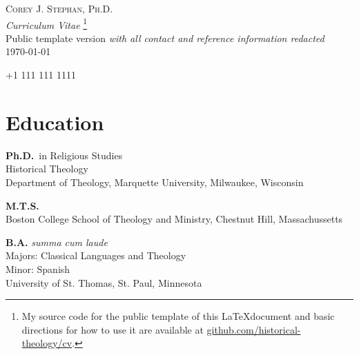 \documentclass[letterpaper,12pt]{article}
\newcommand{\years}[1]{%
  {\reversemarginpar\strut\marginnote{{\small#1}}}%
}
\begin{document}
{
\begin{center}
  \Huge \textsc{Corey J. Stephan, Ph.D.} \\
  
  \normalsize \emph{Curriculum Vitae}
  \footnote{My source code for the public template of this \LaTeX\space document and basic directions for how to use it are available at \href{https:www.github.com/historical-theology/cv}{github.com/historical-theology/cv}.} \\
	Public template version \emph{with all contact and reference information redacted}\\ 
   														
  \today
\end{center}
  \begin{center}
    \normalsize
      \faPhone\space+1 111 111 1111 \space 															
      \enspace\faEnvelope{} \space
      \enspace\faHome{}	
  \end{center}
}



\section*{Education}

\years{2022}%
%
\textbf{Ph.D.}\ in Religious Studies \\
Historical Theology \\
Department of Theology, Marquette University, Milwaukee, Wisconsin \\ [.3cm]
\years{2017}%
%
\textbf{M.T.S.}\ \\
Boston College School of Theology and Ministry, Chestnut Hill, Massachussetts \\ [.3cm]
\years{2015}%
%
\textbf{B.A.} \emph{summa cum laude} \\
Majors: Classical Languages and Theology \\ 
Minor: Spanish \\
University of St. Thomas, St. Paul, Minnesota
\end{document}
